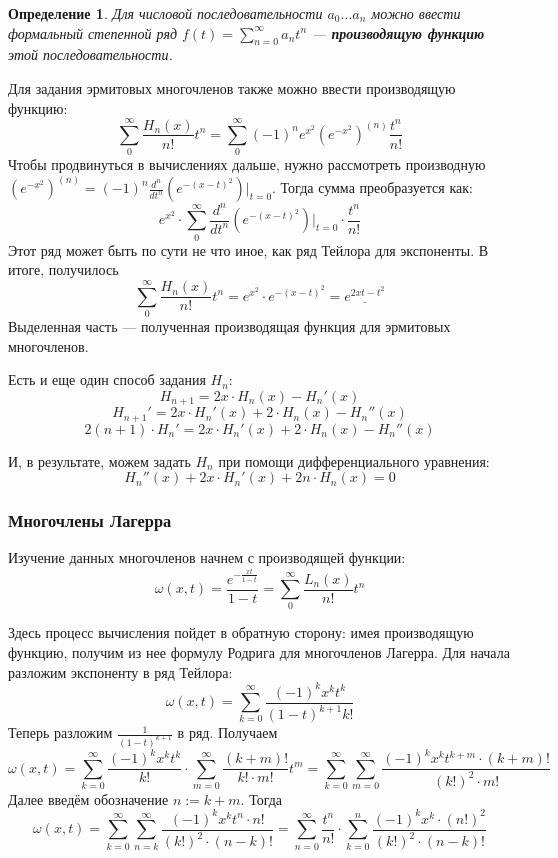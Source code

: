 \documentclass[12pt]{article}
\newtheorem{defi}{Определение}[section]
\begin{document}
	\begin{defi}
	Для числовой последовательности $a_0 \dots a_n$ можно ввести формальный степенной ряд $f(t) = \sum_{n=0}^{\infty} a_n t^n$ 
	--- \textbf{производящую функцию} этой последовательности.
	\end{defi}
	
	Для задания эрмитовых многочленов также можно ввести производящую функцию:
	$$\sum_0^{\infty} \frac{H_n(x)}{n!} t^n = \sum_0^{\infty} (-1)^n e^{x^2} (e^{-x^2})^{(n)} \frac{t^n}{n!}$$
	Чтобы продвинуться в вычислениях дальше, нужно рассмотреть производную $(e^{-x^2})^{(n)} =
	(-1)^n \frac{d^n}{dt^n} (e^{-(x-t)^2}) |_{t=0}$. Тогда сумма преобразуется как:
	$$e^{x^2} \cdot \sum_0^{\infty} \frac{d^n}{dt^n} (e^{-(x-t)^2}) |_{t=0} \cdot \frac{t^n}{n!}$$
	Этот ряд может быть по сути не что иное, как ряд Тейлора для экспоненты. В итоге, получилось
	$$\sum_0^{\infty} \frac{H_n(x)}{n!} t^n = e^{x^2} \cdot e^{-(x-t)^2} = \underline{e^{2xt - t^2}}$$
	Выделенная часть --- полученная производящая функция для эрмитовых многочленов.
	
	Есть и еще один способ задания $H_n$:
	$$H_{n+1} = 2x \cdot H_n(x) - H_n'(x)$$
	$$H_{n+1}' = 2x \cdot H_n'(x) + 2 \cdot H_n(x) - H_n''(x)$$
	$$2(n+1) \cdot H_n' = 2x \cdot H_n'(x) + 2 \cdot H_n(x) - H_n''(x)$$
	
	И, в результате, можем задать $H_n$ при помощи дифференциального уравнения:
	$$H_n''(x) + 2x \cdot H_n'(x) + 2n \cdot H_n(x) = 0$$
	
	\subsubsection{Многочлены Лагерра}
	
	Изучение данных многочленов начнем с производящей функции:
	$$ \omega(x,t) = \frac{e^{-\frac{xt}{1-t}}}{1 - t} = \sum_0^{\infty} \frac{L_n(x)}{n!} t^n$$
	
	Здесь процесс вычисления пойдет в обратную сторону: имея производящую функцию, получим из нее формулу Родрига для
	многочленов Лагерра. Для начала разложим экспоненту в ряд Тейлора:
	$$ \omega(x,t) = \sum_{k=0}^{\infty} \frac{(-1)^k x^k t^k}{(1-t)^{k+1} k!}$$
	Теперь разложим $\frac{1}{(1-t)^{k+1}}$ в ряд. Получаем
	$$ \omega(x,t) = \sum_{k=0}^{\infty} \frac{(-1)^k x^k t^k}{k!} \cdot \sum_{m=0}^{\infty} \frac{(k+m)!}{k! \cdot m!} t^m
	 = \sum_{k=0}^{\infty} \sum_{m=0}^{\infty} \frac{(-1)^k x^k t^{k+m} \cdot (k+m)!}{(k!)^2 \cdot m!} $$
	Далее введём обозначение $n := k+m$. Тогда
	$$ \omega(x,t) = \sum_{k=0}^{\infty} \sum_{n=k}^{\infty} \frac{(-1)^k x^k t^n \cdot n!}{(k!)^2 \cdot (n-k)!}
	 = \sum_{n=0}^{\infty} \frac{t^n}{n!} \cdot \sum_{k=0}^{n} \frac{(-1)^k x^k \cdot (n!)^2}{(k!)^2 \cdot (n-k)!}$$
	 
\end{document}
